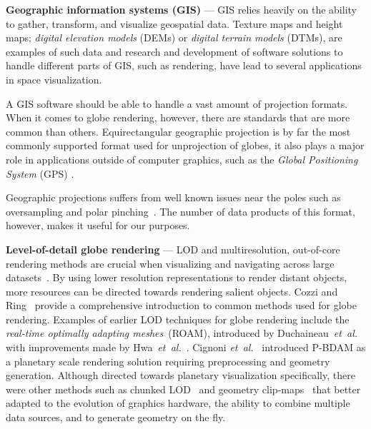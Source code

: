 \documentclass[journal]{vgtc}                %
\newcommand{\plgrem}[1]{\textcolor{blue}{~\textbf{!!}~}}
\newcommand{\etal}{\emph{et~al.}}
\begin{document}


\noindent\textbf{Geographic information systems (GIS)} --- GIS relies heavily on the ability to gather, transform, and visualize geospatial data.
Texture maps and height maps; \emph{digital elevation models} (DEMs) or \emph{digital terrain models} (DTMs), are examples of such data and research and development of software solutions to handle different parts of GIS, such as rendering, have lead to several applications in space visualization.

A GIS software should be able to handle a vast amount of projection formats. When it comes to globe rendering, however, there are standards that are more common than others.
Equirectangular geographic projection is by far the most commonly supported format used for unprojection of globes, it also plays a major role in applications outside of computer graphics, such as the \emph{Global Positioning System} (GPS) \cite{cozzi20113d}.

Geographic projections suffers from well known issues near the poles such as oversampling and polar pinching~\cite{cozzi20113d}. The number of data products of this format, however, makes it useful for our purposes.


\noindent\textbf{Level-of-detail globe rendering} ---
LOD and multiresolution, out-of-core rendering methods are crucial when visualizing and navigating across large datasets~\cite{luebke2003level}.
By using lower resolution representations to render distant objects, more resources can be directed towards rendering salient objects.
Cozzi and Ring~\cite{cozzi20113d} provide a comprehensive introduction to common methods used for globe rendering.
Examples of earlier LOD techniques for globe rendering include the \emph{real-time optimally adapting meshes}~(ROAM), introduced by Duchaineau~\etal~\cite{duchaineau1997roaming} with improvements made by Hwa~\etal~\cite{hwa2005real}.
Cignoni \etal~\cite{cignoni2003planet} introduced P-BDAM as a planetary scale rendering solution requiring preprocessing and geometry generation.
Although directed towards planetary visualization specifically, there were other methods such as chunked LOD~\cite{ulrich2002rendering} and geometry clip-maps~\cite{losasso2004geometry} that better adapted to the evolution of graphics hardware, the ability to combine multiple data sources, and to generate geometry on the fly.
\end{document}
